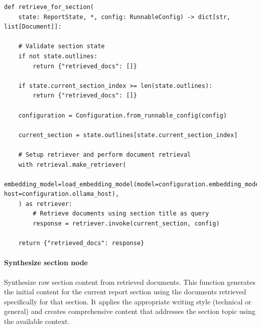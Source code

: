 \documentclass[11pt,a4paper]{report}
\begin{document}
\begin{lstlisting}[caption={Retrieve for section node}]
def retrieve_for_section(
    state: ReportState, *, config: RunnableConfig) -> dict[str, list[Document]]:

    # Validate section state
    if not state.outlines:
        return {"retrieved_docs": []}
    
    if state.current_section_index >= len(state.outlines):
        return {"retrieved_docs": []}
        
    configuration = Configuration.from_runnable_config(config)
    
    current_section = state.outlines[state.current_section_index]

    # Setup retriever and perform document retrieval
    with retrieval.make_retriever(
        embedding_model=load_embedding_model(model=configuration.embedding_model, host=configuration.ollama_host),   
    ) as retriever:
        # Retrieve documents using section title as query
        response = retriever.invoke(current_section, config)
        
    return {"retrieved_docs": response}
\end{lstlisting}

\paragraph{Synthesize section node}

Synthesize raw section content from retrieved documents. This function generates the initial content for the current report section using the documents retrieved specifically for that section. It applies the appropriate writing style (technical or general) and creates comprehensive content that addresses the section topic using the available context.
\end{document}
